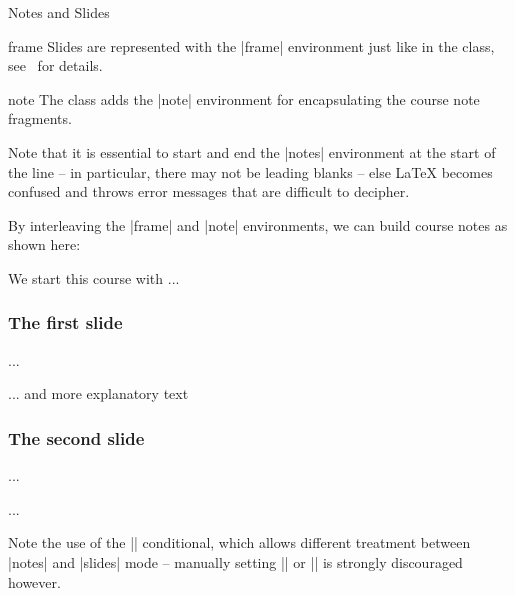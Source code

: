 \begin{sfragment}[id=sec:user:notesslides]{Notes and Slides}

\begin{environment}{frame}
  Slides are represented with the |frame| environment just like in the  class,
  see~\cite{Tantau:ugbc} for details.
\end{environment}

\begin{environment}{note}
  The  class adds the |note| environment for encapsulating the course
  note fragments.
\end{environment}
  
\begin{dangerbox}
  Note that it is essential to start and end the |notes| environment at the start of the
  line -- in particular, there may not be leading blanks -- else {\LaTeX} becomes confused
  and throws error messages that are difficult to decipher.
\end{dangerbox}

By interleaving the |frame| and |note| environments, we can build course notes as shown
here:

\begin{stexcode}
\ifnotes\maketitle\else
\frame[noframenumbering]\maketitle\fi

\begin{note}
  We start this course with ...
\end{note}

\begin{frame}
  \frametitle{The first slide}
  ...
\end{frame}
\begin{note}
  ... and more explanatory text
\end{note}

\begin{frame}
  \frametitle{The second slide}
  ...
\end{frame}
...
\end{stexcode}

\begin{function}{\ifnotes}
  Note the use of the |\ifnotes| conditional, which allows different treatment between
  |notes| and |slides| mode -- manually setting |\notestrue| or |\notesfalse| is strongly
  discouraged however.
\end{function}
 

\end{sfragment}
